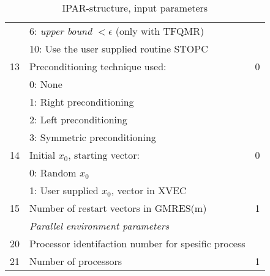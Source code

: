 \documentclass[11pt,a4paper,english,oneside]{report}
\begin{document}
\begin{table}[H]
\begin{tabular*}{\textwidth}{lll}
	& 6: {\em upper bound} $< \epsilon$ (only with TFQMR)	& \\
	& 10: Use the user supplied routine {\ttfamily STOPC} 	&\\
13	& Preconditioning technique used: 			& 0 \\
	& 0: None 						& \\
	& 1: Right preconditioning 				& \\
	& 2: Left preconditioning 				& \\
	& 3: Symmetric preconditioning 				& \\
14 	& Initial $x_{0}$, starting vector: 			& 0 \\
	& 0: Random $x_{0}$					& \\
	& 1: User supplied $x_{0}$, vector in {\ttfamily XVEC} 	& \\
15	& Number of restart vectors in GMRES(m)		 	& 1 \\
\hline
	& {\em Parallel environment parameters} 		& \\
\hline
20 	& Processor identifaction number for spesific process 	& \\
21 	& Number of processors 					& 1 \\
\hline\hline
\end{tabular*}

\caption{IPAR-structure, input parameters}
\label{table:ipar-input}
\end{table}
\end{document}
